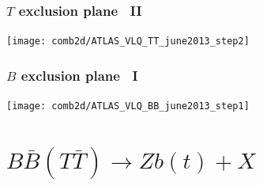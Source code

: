 \documentclass[xcolor=dvipsnames,10pt]{beamer}
\begin{document}
\begin{frame}\frametitle{$T$ exclusion plane~\cite{combination} II}
\footnotesize\centering

\texttt{[image: comb2d/ATLAS\_VLQ\_TT\_june2013\_step2]}

\end{frame}


\begin{frame}\frametitle{$B$ exclusion plane~\cite{combination} I}
\footnotesize\centering

\texttt{[image: comb2d/ATLAS\_VLQ\_BB\_june2013\_step1]}

\end{frame}




\section{$B\bar{B}(T\bar{T})\to Zb(t)+X$}
\end{document}

